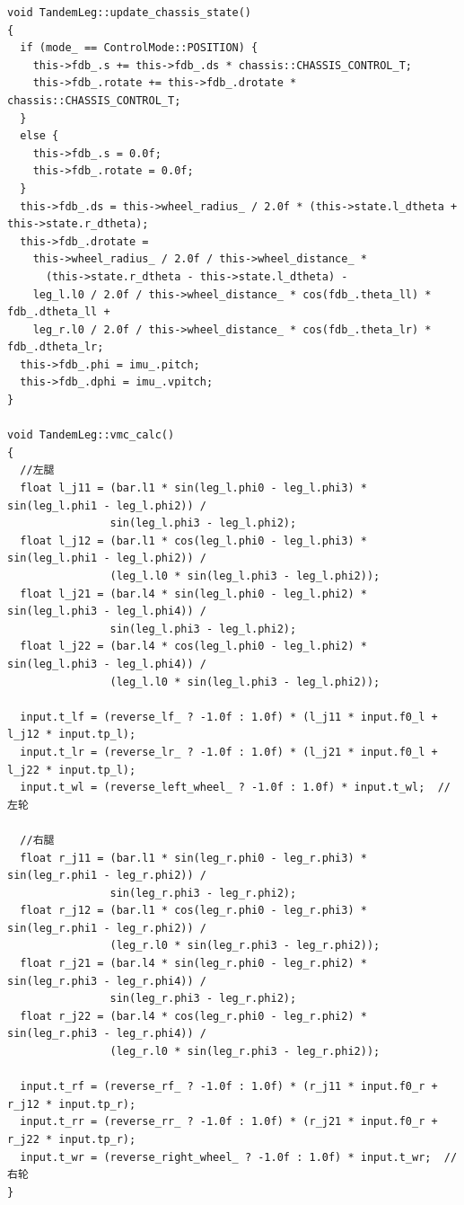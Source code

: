 \documentclass[
  oneside,
  degree=bachelor,
  fullwidthstop=false,
  fontset=fandol,
  times=false,
  minted=true,
  biblatex=true,
]{tongjithesis}
\begin{document}
\begin{verbatim}
void TandemLeg::update_chassis_state()
{
  if (mode_ == ControlMode::POSITION) {
    this->fdb_.s += this->fdb_.ds * chassis::CHASSIS_CONTROL_T;
    this->fdb_.rotate += this->fdb_.drotate * chassis::CHASSIS_CONTROL_T;
  }
  else {
    this->fdb_.s = 0.0f;
    this->fdb_.rotate = 0.0f;
  }
  this->fdb_.ds = this->wheel_radius_ / 2.0f * (this->state.l_dtheta + this->state.r_dtheta);
  this->fdb_.drotate =
    this->wheel_radius_ / 2.0f / this->wheel_distance_ *
      (this->state.r_dtheta - this->state.l_dtheta) -
    leg_l.l0 / 2.0f / this->wheel_distance_ * cos(fdb_.theta_ll) * fdb_.dtheta_ll +
    leg_r.l0 / 2.0f / this->wheel_distance_ * cos(fdb_.theta_lr) * fdb_.dtheta_lr;
  this->fdb_.phi = imu_.pitch;
  this->fdb_.dphi = imu_.vpitch;
}

void TandemLeg::vmc_calc()
{
  //左腿
  float l_j11 = (bar.l1 * sin(leg_l.phi0 - leg_l.phi3) * sin(leg_l.phi1 - leg_l.phi2)) /
                sin(leg_l.phi3 - leg_l.phi2);
  float l_j12 = (bar.l1 * cos(leg_l.phi0 - leg_l.phi3) * sin(leg_l.phi1 - leg_l.phi2)) /
                (leg_l.l0 * sin(leg_l.phi3 - leg_l.phi2));
  float l_j21 = (bar.l4 * sin(leg_l.phi0 - leg_l.phi2) * sin(leg_l.phi3 - leg_l.phi4)) /
                sin(leg_l.phi3 - leg_l.phi2);
  float l_j22 = (bar.l4 * cos(leg_l.phi0 - leg_l.phi2) * sin(leg_l.phi3 - leg_l.phi4)) /
                (leg_l.l0 * sin(leg_l.phi3 - leg_l.phi2));

  input.t_lf = (reverse_lf_ ? -1.0f : 1.0f) * (l_j11 * input.f0_l + l_j12 * input.tp_l);
  input.t_lr = (reverse_lr_ ? -1.0f : 1.0f) * (l_j21 * input.f0_l + l_j22 * input.tp_l);
  input.t_wl = (reverse_left_wheel_ ? -1.0f : 1.0f) * input.t_wl;  //左轮

  //右腿
  float r_j11 = (bar.l1 * sin(leg_r.phi0 - leg_r.phi3) * sin(leg_r.phi1 - leg_r.phi2)) /
                sin(leg_r.phi3 - leg_r.phi2);
  float r_j12 = (bar.l1 * cos(leg_r.phi0 - leg_r.phi3) * sin(leg_r.phi1 - leg_r.phi2)) /
                (leg_r.l0 * sin(leg_r.phi3 - leg_r.phi2));
  float r_j21 = (bar.l4 * sin(leg_r.phi0 - leg_r.phi2) * sin(leg_r.phi3 - leg_r.phi4)) /
                sin(leg_r.phi3 - leg_r.phi2);
  float r_j22 = (bar.l4 * cos(leg_r.phi0 - leg_r.phi2) * sin(leg_r.phi3 - leg_r.phi4)) /
                (leg_r.l0 * sin(leg_r.phi3 - leg_r.phi2));

  input.t_rf = (reverse_rf_ ? -1.0f : 1.0f) * (r_j11 * input.f0_r + r_j12 * input.tp_r);
  input.t_rr = (reverse_rr_ ? -1.0f : 1.0f) * (r_j21 * input.f0_r + r_j22 * input.tp_r);
  input.t_wr = (reverse_right_wheel_ ? -1.0f : 1.0f) * input.t_wr;  //右轮
}


\end{verbatim}
\end{document}
